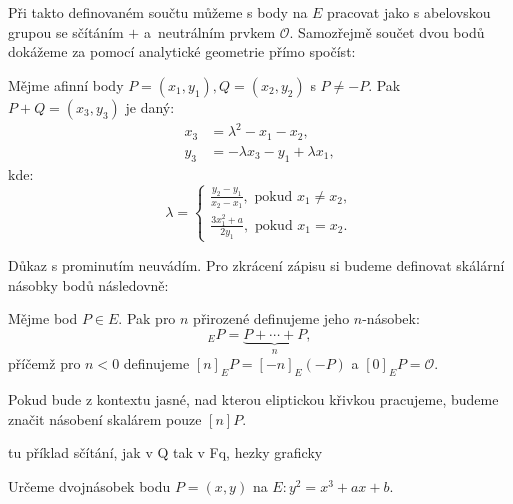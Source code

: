 \documentclass [12pt]{report}
\begin{document}
Při takto definovaném součtu můžeme s body na $E$ pracovat jako s abelovskou grupou se sčítáním $+$ a~neutrálním prvkem $\mathcal{O}$. Samozřejmě součet dvou bodů dokážeme za pomocí analytické geometrie přímo spočíst:
\begin{veta}\label{sum}
Mějme afinní body $P = (x_1,y_1), Q = (x_2,y_2)$ s $P \neq -P$. Pak $P+Q = (x_3,y_3)$ je daný:
\begin{align*}
x_3 &= \lambda^2 - x_1 - x_2,\\
y_3 &= - \lambda x_3 - y_1 + \lambda x_1,
\end{align*}
kde:
\begin{equation*}
\lambda = \begin{cases}
\frac{y_2 - y_1}{x_2-x_1}, \text{ pokud } x_1 \neq x_2,\\
\frac{3x_1 ^2 + a}{2y_1}, \text{ pokud } x_1 = x_2.
\end{cases}
\end{equation*}

\end{veta}
Důkaz s prominutím neuvádím. Pro zkrácení zápisu si budeme definovat skálární násobky bodů následovně:
\begin{definice}
Mějme bod $P \in E$. Pak pro $n$ přirozené definujeme jeho $n$-násobek:
\begin{equation*}
[n]_E P = \underbrace{P+ \cdots + P}_{n},
\end{equation*}
příčemž pro $n < 0$ definujeme $[n]_E P = [-n]_E (-P)$ a $[0]_E P = \mathcal{O}$.
\end{definice}

Pokud bude z kontextu jasné, nad kterou eliptickou křivkou pracujeme, budeme značit násobení skalárem pouze $[n]P$.

\begin{priklad}\label{priklad1}
tu příklad sčítání, jak v Q tak v Fq, hezky graficky\\
\end{priklad}



\begin{priklad}\label{priklad2}
Určeme dvojnásobek bodu $P = (x,y)$ na $E : y^2 = x^3 + ax + b$. 
\end{priklad}
\end{document}
